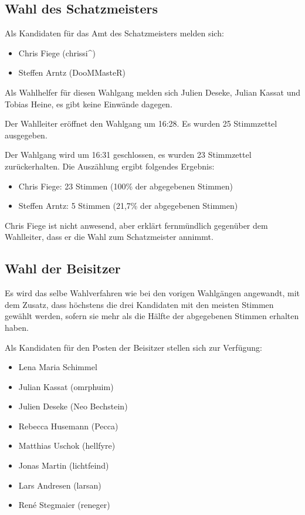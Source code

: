 \documentclass[a4paper,12pt]{scrartcl}
\begin{document}
\subsection{Wahl des Schatzmeisters}
Als Kandidaten für das Amt des Schatzmeisters melden sich:
\begin{itemize}
  \item Chris Fiege (chrissi\textasciicircum)
  \item Steffen Arntz (DooMMasteR)
\end{itemize}

Als Wahlhelfer für diesen Wahlgang melden sich Julien Deseke, Julian Kassat und
Tobias Heine, es gibt keine Einwände dagegen.

Der Wahlleiter eröffnet den Wahlgang um 16:28. Es wurden 25 Stimmzettel
ausgegeben.

Der Wahlgang wird um 16:31 geschlossen, es wurden 23 Stimmzettel zurückerhalten.
Die Auszählung ergibt folgendes Ergebnis:

\begin{itemize}
  \item Chris Fiege: 23 Stimmen (100\% der abgegebenen Stimmen)
  \item Steffen Arntz: 5 Stimmen (21{,}7\% der abgegebenen Stimmen)
\end{itemize}

Chris Fiege ist nicht anwesend, aber erklärt fernmündlich gegenüber dem
Wahlleiter, dass er die Wahl zum Schatzmeister annimmt.

\subsection{Wahl der Beisitzer}
Es wird das selbe Wahlverfahren wie bei den vorigen Wahlgängen angewandt, mit
dem Zusatz, dass höchstens die drei Kandidaten mit den meisten Stimmen gewählt
werden, sofern sie mehr als die Hälfte der abgegebenen Stimmen erhalten haben.

Als Kandidaten für den Posten der Beisitzer stellen sich zur Verfügung:
\begin{itemize}
  \item Lena Maria Schimmel
  \item Julian Kassat (omrphuim)
  \item Julien Deseke (Neo Bechstein)
  \item Rebecca Husemann (Pecca)
  \item Matthias Uschok (hellfyre)
  \item Jonas Martin (lichtfeind)
  \item Lars Andresen (larsan)
  \item René Stegmaier (reneger)
\end{itemize}
\end{document}
